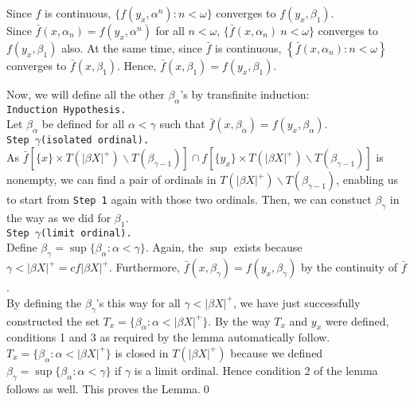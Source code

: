 \documentclass{article}
\begin{document}
																													    \vskip 15pt 

																													    Since $f$ is continuous, $\{f(y_x,\alpha^n): n<\omega\}$ converges to $f(y_x,\beta_1)$.\\
																														Since $\bar{f}(x,\alpha_n)=f(y_x,\alpha^n)$ for all $n<\omega$, $\{\bar{f}(x,\alpha_n)\: n<\omega\}$ converges to $f(y_x,\beta_1)$ also. At the same time, since $\bar{f}$ is continuous, $\left\{\bar{f}(x,\alpha_n): n<\omega\right\}$ converges to $\bar{f}(x,\beta_1).$ Hence, $\bar{f}(x, \beta_1)=f(y_x,\beta_1).$

																														\vskip 20pt

																														Now, we will define all the other $\beta_\alpha$'s by transfinite induction: \\

																														\texttt{Induction Hypothesis.}\\
																														    Let $\beta_\alpha$ be defined for all $\alpha<\gamma$ such that $\bar{f}(x,\beta_\alpha)=f(y_x,\beta_\alpha)$.\\

																														    \texttt{Step $\gamma$(isolated ordinal).}\\
																															As $\bar{f}[\{x\}\times T(|\beta X|^+)\backslash T(\beta_{\gamma-1})] \cap f[\{y_x\} \times T(|\beta X |^+)\backslash T(\beta_{\gamma-1})]$ is nonempty, we can find a pair of ordinals in  $T(|\beta X|^+)\backslash T(\beta_{\gamma-1})$, enabling us to start from \texttt{Step 1} again with those two ordinals. Then, we can constuct $\beta_\gamma$ in the way as we did for $\beta_1$.\\


																															\texttt{Step $\gamma$(limit ordinal).}\\
																															    Define $\beta_\gamma = \sup\{\beta_\alpha: \alpha<\gamma\}.$ Again, the $\sup$ exists because $\gamma < |\beta X|^+= cf|\beta X|^+.$ Furthermore, $\bar{f}(x,\beta_\gamma)=f(y_x,\beta_\gamma)$ by the continuity of $\bar{f}$.\\


																															    By defining the $\beta_\gamma$'s this way for all $\gamma <|\beta X|^+$, we have just successfully constructed the set $T_x=\{\beta_\alpha: \alpha < |\beta X|^+\}$. By the way $T_x$ and $y_x$ were defined, conditions 1 and 3 as required by the lemma automatically follow.  $T_x=\{\beta_\alpha: \alpha < |\beta X|^+\}$ is
																															    closed in $T(|\beta X|^+)$ because we defined $\beta_\gamma = \sup\{\beta_\alpha: \alpha<\gamma\}$ if $\gamma$ is a limit ordinal. Hence condition 2 of the lemma follows as well. This proves the Lemma.\qed
\end{document}
